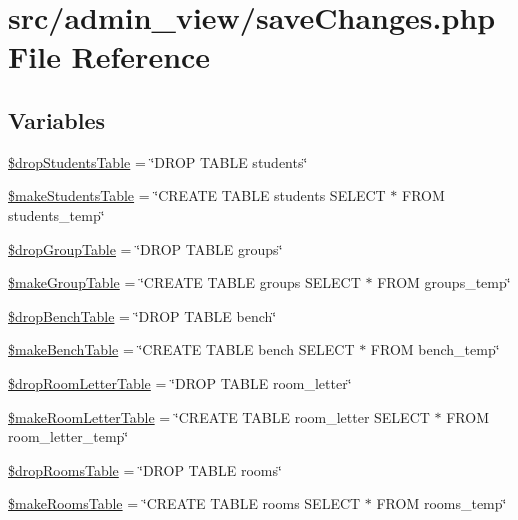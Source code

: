 \hypertarget{saveChanges_8php}{\section{src/admin\-\_\-view/save\-Changes.php \-File \-Reference}
\label{saveChanges_8php}
}
\subsection*{\-Variables}
\begin{DoxyCompactItemize}
\item 
\hyperlink{saveChanges_8php_a890bb7ba10da65398c02b972c41cf066}{\$drop\-Students\-Table} = \char`\"{}\-D\-R\-O\-P \-T\-A\-B\-L\-E students\char`\"{}
\item 
\hyperlink{saveChanges_8php_abfc3a70bbc2069601691a0ef55e48339}{\$make\-Students\-Table} = \char`\"{}\-C\-R\-E\-A\-T\-E \-T\-A\-B\-L\-E students \-S\-E\-L\-E\-C\-T $\ast$ \-F\-R\-O\-M students\-\_\-temp\char`\"{}
\item 
\hyperlink{saveChanges_8php_a18166bcedc8365797576ea4588336103}{\$drop\-Group\-Table} = \char`\"{}\-D\-R\-O\-P \-T\-A\-B\-L\-E groups\char`\"{}
\item 
\hyperlink{saveChanges_8php_abfd1f54ec496d2849f2540e4edda83ce}{\$make\-Group\-Table} = \char`\"{}\-C\-R\-E\-A\-T\-E \-T\-A\-B\-L\-E groups \-S\-E\-L\-E\-C\-T $\ast$ \-F\-R\-O\-M groups\-\_\-temp\char`\"{}
\item 
\hyperlink{saveChanges_8php_a7313484aeb7d5b2f6345bf9982c6a9f8}{\$drop\-Bench\-Table} = \char`\"{}\-D\-R\-O\-P \-T\-A\-B\-L\-E bench\char`\"{}
\item 
\hyperlink{saveChanges_8php_a2fe3590b8c0170965449809606284e4f}{\$make\-Bench\-Table} = \char`\"{}\-C\-R\-E\-A\-T\-E \-T\-A\-B\-L\-E bench \-S\-E\-L\-E\-C\-T $\ast$ \-F\-R\-O\-M bench\-\_\-temp\char`\"{}
\item 
\hyperlink{saveChanges_8php_a0d3339afd4cc2f07bb66a9886640da39}{\$drop\-Room\-Letter\-Table} = \char`\"{}\-D\-R\-O\-P \-T\-A\-B\-L\-E room\-\_\-letter\char`\"{}
\item 
\hyperlink{saveChanges_8php_a1c26c6ec70102808c49bc495c147c649}{\$make\-Room\-Letter\-Table} = \char`\"{}\-C\-R\-E\-A\-T\-E \-T\-A\-B\-L\-E room\-\_\-letter \-S\-E\-L\-E\-C\-T $\ast$ \-F\-R\-O\-M room\-\_\-letter\-\_\-temp\char`\"{}
\item 
\hyperlink{saveChanges_8php_a8331fe5aa4e7e92b391e5cf19801f527}{\$drop\-Rooms\-Table} = \char`\"{}\-D\-R\-O\-P \-T\-A\-B\-L\-E rooms\char`\"{}
\item 
\hyperlink{saveChanges_8php_a5a8d87069cd729a066d0e7884c9cbe8d}{\$make\-Rooms\-Table} = \char`\"{}\-C\-R\-E\-A\-T\-E \-T\-A\-B\-L\-E rooms \-S\-E\-L\-E\-C\-T $\ast$ \-F\-R\-O\-M rooms\-\_\-temp\char`\"{}
\end{DoxyCompactItemize}


